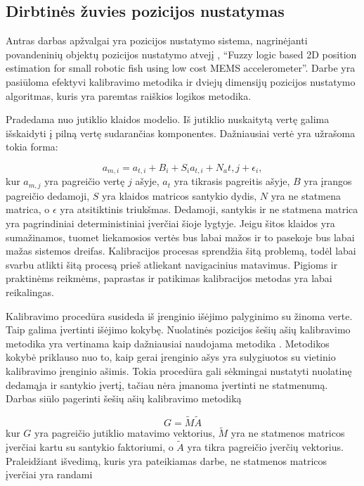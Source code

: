 \subsection{Dirbtinės žuvies pozicijos nustatymas}

Antras darbas apžvalgai yra pozicijos nustatymo sistema, nagrinėjanti povandeninių objektų pozicijos nustatymo atvejį \cite{yoo2011fuzzy}, ``Fuzzy logic based 2D position estimation for small robotic fish using low cost MEMS accelerometer''. Darbe yra pasiūloma efektyvi kalibravimo metodika ir dviejų dimensijų pozicijos nustatymo algoritmas, kuris yra paremtas raiškios logikos metodika. 

Pradedama nuo jutiklio klaidos modelio. Iš jutiklio nuskaitytą vertę galima išskaidyti į pilną vertę sudarančias komponentes. Dažniausiai vertė yra užrašoma tokia forma:

\begin{equation}
    a_{m,i} = a_{t,i} + B_i + S_{i}a_{t,i} + N_a{t,j} + \epsilon_i,
\end{equation}
kur $a_{m,j}$ yra pagreičio vertę $j$ ašyje, $a_t$ yra tikrasis pagreitis ašyje, $B$ yra įrangos pagreičio dedamoji, $S$ yra klaidos matricos santykio dydis, $N$ yra ne statmena matrica, o $\epsilon$ yra atsitiktinis triukšmas. Dedamoji, santykis ir ne statmena matrica yra pagrindiniai deterministiniai įverčiai šioje lygtyje. Jeigu šitos klaidos yra sumažinamos, tuomet liekamosios vertės bus labai mažos ir to pasekoje bus labai mažas sistemos dreifas. Kalibracijos procesas sprendžia šitą problemą, todėl labai svarbu atlikti šitą procesą prieš atliekant navigacinius matavimus. Pigioms ir praktinėms reikmėms, paprastas ir patikimas kalibracijos metodas yra labai reikalingas.

Kalibravimo procedūra susideda iš įrenginio išėjimo palyginimo su žinoma verte. Taip galima įvertinti išėjimo kokybę. Nuolatinės pozicijos šešių ašių kalibravimo metodika yra vertinama kaip dažniausiai naudojama metodika \cite{syed2007new}. Metodikos kokybė priklauso nuo to, kaip gerai įrenginio ašys yra sulygiuotos su vietinio kalibravimo įrenginio ašimis. Tokia procedūra gali sėkmingai nustatyti nuolatinę dedamąja ir santykio įvertį, tačiau nėra įmanoma įvertinti ne statmenumą. Darbas siūlo pagerinti šešių ašių kalibravimo metodiką 

\begin{equation}
    G = \tilde{M} \tilde{A}
\end{equation}
kur $G$ yra pagreičio jutiklio matavimo vektorius, $\tilde{M}$ yra ne statmenos matricos įverčiai kartu su santykio faktoriumi, o $\tilde{A}$ yra tikra pagreičio įverčių vektorius. Praleidžiant išvedimą, kuris yra pateikiamas darbe, ne statmenos matricos įverčiai yra randami

